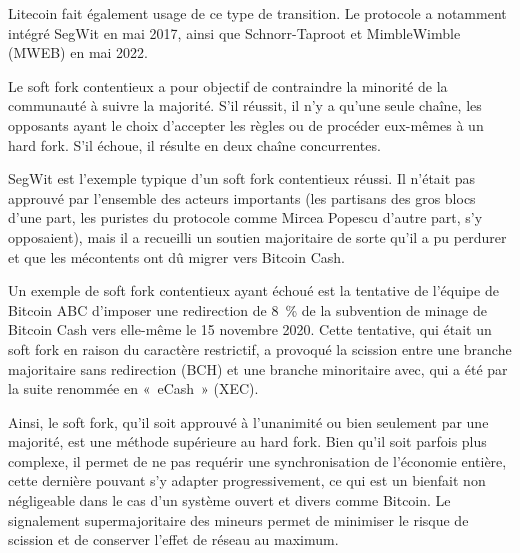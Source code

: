 Litecoin fait également usage de ce type de transition. Le protocole a notamment intégré SegWit en mai 2017, ainsi que Schnorr-Taproot et MimbleWimble (MWEB) en mai 2022.

Le soft fork contentieux a pour objectif de contraindre la minorité de la communauté à suivre la majorité. S'il réussit, il n'y a qu'une seule chaîne, les opposants ayant le choix d'accepter les règles ou de procéder eux-mêmes à un hard fork. S'il échoue, il résulte en deux chaîne concurrentes.

SegWit est l'exemple typique d'un soft fork contentieux réussi. Il n'était pas approuvé par l'ensemble des acteurs importants (les partisans des gros blocs d'une part, les puristes du protocole comme Mircea Popescu d'autre part, s'y opposaient), mais il a recueilli un soutien majoritaire de sorte qu'il a pu perdurer et que les mécontents  ont dû migrer vers Bitcoin Cash.

Un exemple de soft fork contentieux ayant échoué est la tentative de l'équipe de Bitcoin ABC d'imposer une redirection de 8~\% de la subvention de minage de Bitcoin Cash vers elle-même le 15 novembre 2020. Cette tentative, qui était un soft fork en raison du caractère restrictif, a provoqué la scission entre une branche majoritaire sans redirection (BCH) et une branche minoritaire avec, qui a été par la suite renommée en «~eCash~» (XEC).

Ainsi, le soft fork, qu'il soit approuvé à l'unanimité ou bien seulement par une majorité, est une méthode supérieure au hard fork. Bien qu'il soit parfois plus complexe, il permet de ne pas requérir une synchronisation de l'économie entière, cette dernière pouvant s'y adapter progressivement, ce qui est un bienfait non négligeable dans le cas d'un système ouvert et divers comme Bitcoin. Le signalement supermajoritaire des mineurs permet de minimiser le risque de scission et de conserver l'effet de réseau au maximum.


